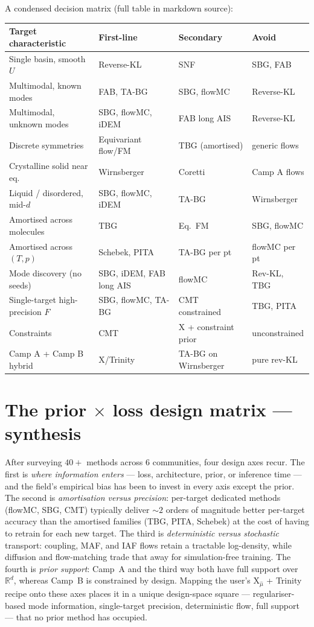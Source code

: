 \documentclass[11pt,letterpaper]{article}
\newcommand{\Real}{\mathbb{R}}
\newcommand{\Xfun}{\mathrm{X}}
\theoremstyle{plain}
\begin{document}
A condensed decision matrix (full table in markdown source):

\begin{longtable}{@{}p{4.5cm}p{4cm}p{3.5cm}p{3cm}@{}}
\toprule
Target characteristic & First-line & Secondary & Avoid\\
\midrule\endhead
Single basin, smooth $U$ & Reverse-KL & SNF & SBG, FAB\\
Multimodal, known modes & FAB, TA-BG & SBG, flowMC & Reverse-KL\\
Multimodal, unknown modes & SBG, flowMC, iDEM & FAB long AIS & Reverse-KL\\
Discrete symmetries & Equivariant flow/FM & TBG (amortised) & generic flows\\
Crystalline solid near eq.\ & Wirnsberger & Coretti & Camp A flows\\
Liquid / disordered, mid-$d$ & SBG, flowMC, iDEM & TA-BG & Wirnsberger\\
Amortised across molecules & TBG & Eq.\ FM & SBG, flowMC\\
Amortised across $(T,p)$ & Schebek, PITA & TA-BG per pt & flowMC per pt\\
Mode discovery (no seeds) & SBG, iDEM, FAB long AIS & flowMC & Rev-KL, TBG\\
Single-target high-precision $F$ & SBG, flowMC, TA-BG & CMT constrained & TBG, PITA\\
Constraints & CMT & $\Xfun$ + constraint prior & unconstrained\\
Camp A + Camp B hybrid & $\Xfun$/Trinity & TA-BG on Wirnsberger & pure rev-KL\\
\bottomrule
\end{longtable}

\section{The prior $\times$ loss design matrix --- synthesis}

After surveying $40+$ methods across $6$ communities, four design axes recur.
The first is \emph{where information enters} --- loss, architecture, prior,
or inference time --- and the field's empirical bias has been to invest in
every axis except the prior. The second is \emph{amortisation versus
precision}: per-target dedicated methods (flowMC, SBG, CMT) typically deliver
$\sim 2$ orders of magnitude better per-target accuracy than the amortised
families (TBG, PITA, Schebek) at the cost of having to retrain for each new
target. The third is \emph{deterministic versus stochastic} transport:
coupling, MAF, and IAF flows retain a tractable log-density, while
diffusion and flow-matching trade that away for simulation-free training.
The fourth is \emph{prior support}: Camp~A and the third way both have full
support over $\Real^d$, whereas Camp~B is constrained by design. Mapping the
user's $\Xfun_{\hat\mu}$ + Trinity recipe onto these axes places it in a
unique design-space square --- regulariser-based mode information,
single-target precision, deterministic flow, full support --- that no prior
method has occupied.
\end{document}
